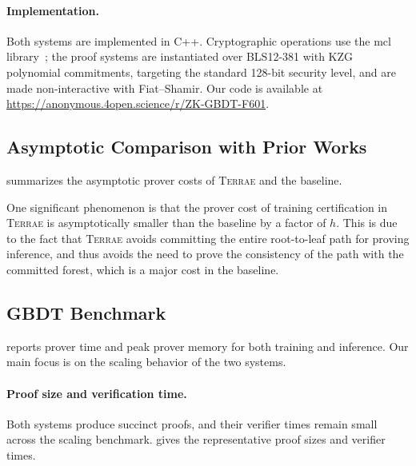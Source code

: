 \paragraph{Implementation.} 
Both systems are implemented in C++.  Cryptographic operations use the mcl
library~\cite{mcllib}; the proof systems are instantiated over BLS12-381 with
KZG polynomial commitments, targeting the standard 128-bit security level, and
are made non-interactive with Fiat--Shamir.  Our code is available at
\url{https://anonymous.4open.science/r/ZK-GBDT-F601}.


\subsection{Asymptotic Comparison with Prior Works}\label{subsec:eval-asymptotic}

 summarizes the asymptotic prover costs of
\textsc{Terrae} and the baseline. 



One significant phenomenon is that the prover cost of training certification in \textsc{Terrae} is asymptotically smaller than the baseline by a factor of $h$.
This is due to the fact that \textsc{Terrae} avoids
committing the entire root-to-leaf path for proving inference, and thus avoids the need to prove the consistency of the path with the committed forest, which is a major cost in the baseline.

\subsection{GBDT Benchmark}\label{subsec:eval-three-dim}

 reports prover time and peak prover memory for
both training and inference.
Our main focus is on the scaling behavior of the two systems.



\paragraph{Proof size and verification time.}
Both systems produce succinct proofs, and their verifier times remain small
across the scaling benchmark.  gives the
representative proof sizes and verifier times.



